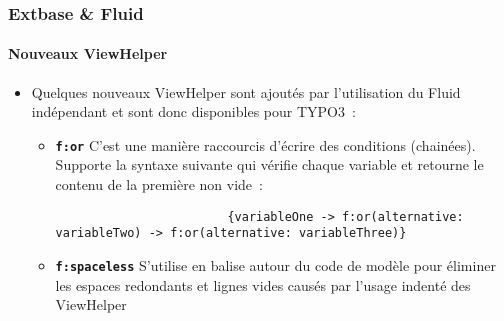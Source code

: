 \begin{frame}[fragile]
	\frametitle{Extbase \& Fluid}
	\framesubtitle{Nouveaux ViewHelper}

	\lstset{basicstyle=\tiny\ttfamily}

	\begin{itemize}
		\item Quelques nouveaux ViewHelper sont ajoutés par l'utilisation du Fluid
			indépendant et sont donc disponibles pour TYPO3~:

			\begin{itemize}

				\item \textbf{\texttt{f:or}}\newline
					C'est une manière raccourcis d'écrire des conditions (chainées).
					Supporte la syntaxe suivante qui vérifie chaque variable et retourne
					le contenu de la première non vide~:

					\begin{lstlisting}
						{variableOne -> f:or(alternative: variableTwo) -> f:or(alternative: variableThree)}
					\end{lstlisting}

				\item \textbf{\texttt{f:spaceless}}\newline
					S'utilise en balise autour du code de modèle pour éliminer les
					espaces redondants et lignes vides causés par l'usage indenté des
					ViewHelper

			\end{itemize}

	\end{itemize}

\end{frame}


